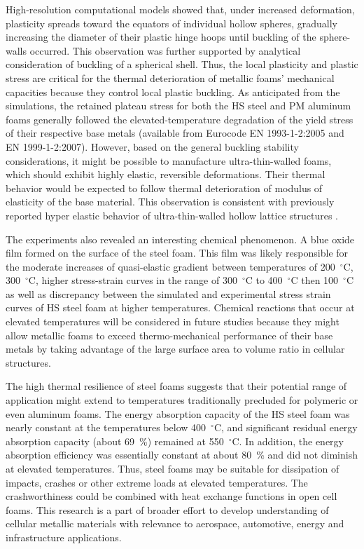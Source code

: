 \documentclass[review]{elsarticle}
\begin{document}
High-resolution computational models showed that, under increased deformation, plasticity spreads toward the equators of individual hollow spheres, gradually increasing the diameter of their plastic hinge hoops until buckling of the sphere-walls occurred. This observation was further supported by analytical consideration of buckling of a spherical shell. Thus, the local plasticity and plastic stress are critical for the thermal deterioration of metallic foams' mechanical capacities because they control local plastic buckling. As anticipated from the simulations, the retained plateau stress for both the HS steel and PM aluminum foams generally followed the elevated-temperature degradation of the yield stress of their respective base metals (available from Eurocode EN 1993-1-2:2005 and EN 1999-1-2:2007). However, based on the general buckling stability considerations, it might be possible to manufacture ultra-thin-walled foams, which should exhibit highly elastic, reversible deformations. Their thermal behavior would be expected to follow thermal deterioration of modulus of elasticity of the base material. This observation is consistent with previously reported hyper elastic behavior of ultra-thin-walled hollow lattice structures \cite{Sch2011}.

The experiments also revealed an interesting chemical phenomenon. A blue oxide film formed on the surface of the steel foam. This film was likely responsible for the moderate increases of quasi-elastic gradient between temperatures of 200~$^\circ\mathrm{C}$, 300~$^\circ\mathrm{C}$, higher stress-strain curves in the range of 300~$^\circ\mathrm{C}$ to 400~$^\circ\mathrm{C}$ then 100~$^\circ\mathrm{C}$ as well as discrepancy between the simulated and experimental stress strain curves of HS steel foam at higher temperatures.  Chemical reactions that occur at elevated temperatures will be considered in future studies because they might allow metallic foams to exceed thermo-mechanical performance of their base metals by taking advantage of the large surface area to volume ratio in cellular structures.

The high thermal resilience of steel foams suggests that their potential range of application might extend to temperatures traditionally precluded for polymeric or even aluminum foams. The energy absorption capacity of the HS steel foam was nearly constant at the temperatures below 400~$^\circ\mathrm{C}$, and significant residual energy absorption capacity (about 69~\%) remained at 550~$^\circ\mathrm{C}$. In addition, the energy absorption efficiency was essentially constant at about 80~\% and did not diminish at elevated temperatures. Thus, steel foams may be suitable for dissipation of impacts, crashes or other extreme loads at elevated temperatures. The crashworthiness could be combined with heat exchange functions in open cell foams. This research is a part of broader effort to develop understanding of cellular metallic materials with relevance to aerospace, automotive, energy and infrastructure applications.
\end{document}
